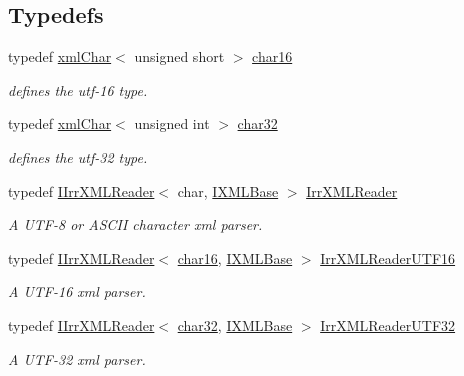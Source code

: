 \subsection*{Typedefs}
\begin{DoxyCompactItemize}
\item 
typedef \hyperlink{structirr_1_1io_1_1xmlChar}{xml\+Char}$<$ unsigned short $>$ \hyperlink{namespaceirr_1_1io_a9140fe380f1a4e2fb4e114463e2d2838}{char16}
\begin{DoxyCompactList}\small\item\em defines the utf-\/16 type. \end{DoxyCompactList}\item 
typedef \hyperlink{structirr_1_1io_1_1xmlChar}{xml\+Char}$<$ unsigned int $>$ \hyperlink{namespaceirr_1_1io_adfbb5748d02235670728f95ab89b69a4}{char32}
\begin{DoxyCompactList}\small\item\em defines the utf-\/32 type. \end{DoxyCompactList}\item 
typedef \hyperlink{classirr_1_1io_1_1IIrrXMLReader}{I\+Irr\+X\+M\+L\+Reader}$<$ char, \hyperlink{classirr_1_1io_1_1IXMLBase}{I\+X\+M\+L\+Base} $>$ \hyperlink{namespaceirr_1_1io_a1628edbb9d5d53f18c82d2a92b0ad27e}{Irr\+X\+M\+L\+Reader}
\begin{DoxyCompactList}\small\item\em A U\+T\+F-\/8 or A\+S\+C\+II character xml parser. \end{DoxyCompactList}\item 
typedef \hyperlink{classirr_1_1io_1_1IIrrXMLReader}{I\+Irr\+X\+M\+L\+Reader}$<$ \hyperlink{namespaceirr_1_1io_a9140fe380f1a4e2fb4e114463e2d2838}{char16}, \hyperlink{classirr_1_1io_1_1IXMLBase}{I\+X\+M\+L\+Base} $>$ \hyperlink{namespaceirr_1_1io_a5eb4094dfd0d509e0cd8a9d1dd30a5b9}{Irr\+X\+M\+L\+Reader\+U\+T\+F16}
\begin{DoxyCompactList}\small\item\em A U\+T\+F-\/16 xml parser. \end{DoxyCompactList}\item 
typedef \hyperlink{classirr_1_1io_1_1IIrrXMLReader}{I\+Irr\+X\+M\+L\+Reader}$<$ \hyperlink{namespaceirr_1_1io_adfbb5748d02235670728f95ab89b69a4}{char32}, \hyperlink{classirr_1_1io_1_1IXMLBase}{I\+X\+M\+L\+Base} $>$ \hyperlink{namespaceirr_1_1io_a70f411ff403636fb5c4e9becb090d5ec}{Irr\+X\+M\+L\+Reader\+U\+T\+F32}
\begin{DoxyCompactList}\small\item\em A U\+T\+F-\/32 xml parser. \end{DoxyCompactList}\item 

\end{DoxyCompactItemize}
